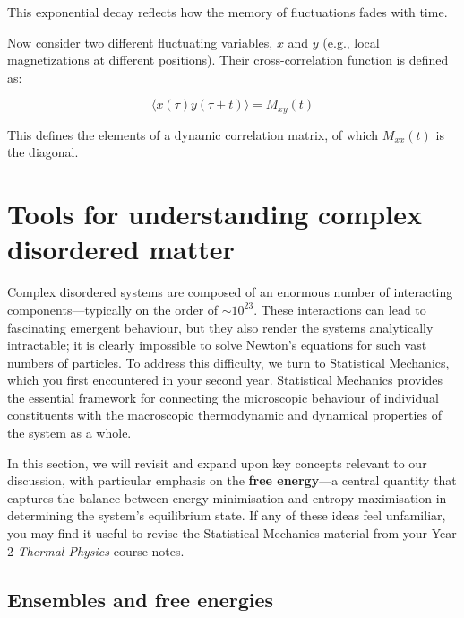 \documentclass[
  letterpaper,
  enabledeprecatedfontcommands]{report}
\begin{document}
This exponential decay reflects how the memory of fluctuations fades
with time.

Now consider two different fluctuating variables, \(x\) and \(y\) (e.g.,
local magnetizations at different positions). Their cross-correlation
function is defined as:

\[
\langle x(\tau) y(\tau + t) \rangle = M_{xy}(t)
\]

This defines the elements of a dynamic correlation matrix, of which
\(M_{xx}(t)\) is the diagonal.

\chapter*{Tools for understanding complex disordered
matter}\label{tools-for-understanding-complex-disordered-matter}


Complex disordered systems are composed of an enormous number of
interacting components---typically on the order of \(\sim 10^{23}\).
These interactions can lead to fascinating emergent behaviour, but they
also render the systems analytically intractable; it is clearly
impossible to solve Newton's equations for such vast numbers of
particles. To address this difficulty, we turn to Statistical Mechanics,
which you first encountered in your second year. Statistical Mechanics
provides the essential framework for connecting the microscopic
behaviour of individual constituents with the macroscopic thermodynamic
and dynamical properties of the system as a whole.

In this section, we will revisit and expand upon key concepts relevant
to our discussion, with particular emphasis on the \textbf{free
energy}---a central quantity that captures the balance between energy
minimisation and entropy maximisation in determining the system's
equilibrium state. If any of these ideas feel unfamiliar, you may find
it useful to revise the Statistical Mechanics material from your Year 2
\emph{Thermal Physics} course notes.

\section*{Ensembles and free
energies}\label{ensembles-and-free-energies}
\end{document}
